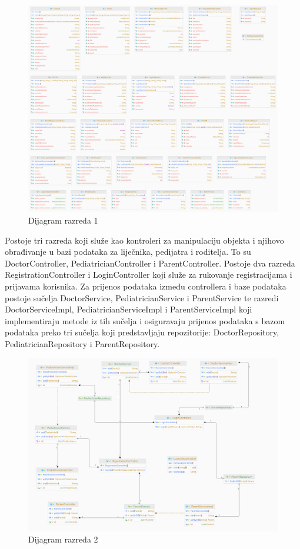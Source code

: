 			
			\begin{figure}[H]
				\includegraphics[scale=0.0925]{dijagrami/dijraz1.PNG} %
				\centering
				\caption{Dijagram razreda 1}
				\label{fig:dijraz1}
			\end{figure}
			\clearpage
			\text Postoje tri razreda koji služe kao kontroleri za manipulaciju objekta i njihovo obrađivanje u bazi podataka za liječnika, pedijatra i roditelja. To su DoctorController, PediatricianController i ParentController. Postoje dva razreda RegistrationController i LoginController koji služe za rukovanje registracijama i prijavama korisnika. Za prijenos podataka između controllera i baze podataka postoje sučelja DoctorService, PediatricianService i ParentService te razredi DoctorServiceImpl, PediatricianServiceImpl i ParentServiceImpl koji implementiraju metode iz tih sučelja i osiguravaju prijenos podataka s bazom podataka preko tri sučelja koji predstavljaju repozitorije: DoctorRepository, PediatricianRepository i ParentRepository.
			\begin{figure}[H]
				\includegraphics[scale=0.225]{dijagrami/dijraz2.PNG} %
				\centering
				\caption{Dijagram razreda 2}
				\label{fig:dijraz2}
			\end{figure} 
			
